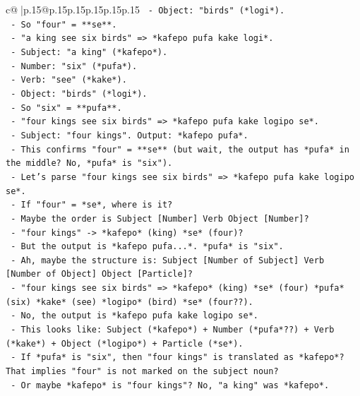 \documentclass{article}
\begin{document}
{\begin{supertabular}{c@{$\;$}|p{.15\linewidth}@{}p{.15\linewidth}p{.15\linewidth}p{.15\linewidth}p{.15\linewidth}p{.15\linewidth}}
{{{\texttt{      {-} Object: "birds" (*logi*).} \\
\texttt{      {-} So "four" = **se**.} \\
\texttt{    {-} "a king see six birds" => *kafepo pufa kake logi*.} \\
\texttt{      {-} Subject: "a king" (*kafepo*).} \\
\texttt{      {-} Number: "six" (*pufa*).} \\
\texttt{      {-} Verb: "see" (*kake*).} \\
\texttt{      {-} Object: "birds" (*logi*).} \\
\texttt{      {-} So "six" = **pufa**.} \\
\texttt{    {-} "four kings see six birds" => *kafepo pufa kake logipo se*.} \\
\texttt{      {-} Subject: "four kings". Output: *kafepo pufa*.} \\
\texttt{      {-} This confirms "four" = **se** (but wait, the output has *pufa* in the middle? No, *pufa* is "six").} \\
\texttt{      {-} Let's parse "four kings see six birds" => *kafepo pufa kake logipo se*.} \\
\texttt{      {-} If "four" = *se*, where is it?} \\
\texttt{      {-} Maybe the order is Subject {[}Number{]} Verb Object {[}Number{]}?} \\
\texttt{      {-} "four kings" {-}> *kafepo* (king) *se* (four)?} \\
\texttt{      {-} But the output is *kafepo pufa...*. *pufa* is "six".} \\
\texttt{      {-} Ah, maybe the structure is: Subject {[}Number of Subject{]} Verb {[}Number of Object{]} Object {[}Particle{]}?} \\
\texttt{      {-} "four kings see six birds" => *kafepo* (king) *se* (four) *pufa* (six) *kake* (see) *logipo* (bird) *se* (four??).} \\
\texttt{      {-} No, the output is *kafepo pufa kake logipo se*.} \\
\texttt{      {-} This looks like: Subject (*kafepo*) + Number (*pufa*??) + Verb (*kake*) + Object (*logipo*) + Particle (*se*).} \\
\texttt{      {-} If *pufa* is "six", then "four kings" is translated as *kafepo*? That implies "four" is not marked on the subject noun?} \\
\texttt{      {-} Or maybe *kafepo* is "four kings"? No, "a king" was *kafepo*.} \\
}}}
\end{supertabular}}
\end{document}
